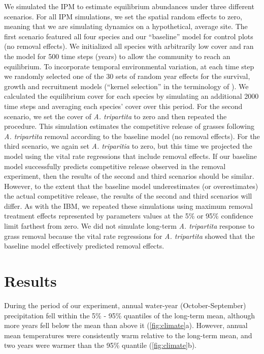 \documentclass[11pt]{article}
\begin{document}
\begin{doublespacing}
We simulated the IPM to estimate equilibrium abundances under three different scenarios. For all IPM simulations, we set the spatial random effects to zero, meaning that we are simulating dynamics on a hypothetical, average site. The first scenario featured all four species and our ``baseline'' model for control plots (no removal effects). We initialized all species with arbitrarily low cover and ran the model for 500 time steps (years) to allow the community to reach an equilibrium. To incorporate temporal environmental variation, at each time step we randomly selected one of the 30 sets of random year effects for the survival, growth and recruitment models (``kernel selection'' in the terminology of \citealt{metcalf_statistical_2015}). We calculated the equilibrium cover for each species by simulating an additional 2000 time steps and averaging each species' cover over this period. For the second scenario, we set the cover of \textit{A. tripartita} to zero and then repeated the procedure. This simulation estimates the competitive release of grasses following \textit{A. tripartita} removal according to the baseline model (no removal effects). For the third scenario, we again set  \textit{A. triparitia} to zero, but this time we projected the model using the vital rate regressions that include removal effects. If our baseline model successfully predicts competitive release observed in the removal experiment, then the results of the second and third scenarios should be similar. However, to the extent that the baseline model underestimates (or overestimates) the actual competitive release, the results of the second and third scenarios will differ. As with the IBM, we repeated these simulations using maximum removal treatment effects represented by parameters values at the 5\% or 95\% confidence limit farthest from zero. We did not simulate long-term \textit{A. tripartita} response to grass removal because the vital rate regressions for \textit{A. tripartita} showed that the baseline model effectively predicted removal effects.


\section*{Results}

During the period of our experiment, annual water-year (October-September) precipitation fell within the 5\% - 95\% quantiles of the long-term mean, although more years fell below the mean than above it (\ref{fig:climate}a). However, annual mean temperatures were consistently warm relative to the long-term mean, and two years were warmer than the 95\% quantile (\ref{fig:climate}b).  


\end{doublespacing}
\end{document}
